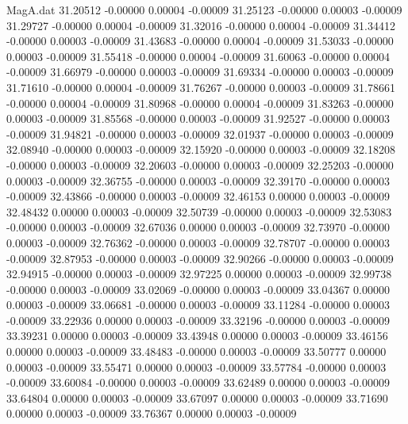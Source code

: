 \begin{filecontents}{MagA.dat}
  31.20512   -0.00000    0.00004   -0.00009
  31.25123   -0.00000    0.00003   -0.00009
  31.29727   -0.00000    0.00004   -0.00009
  31.32016   -0.00000    0.00004   -0.00009
  31.34412   -0.00000    0.00003   -0.00009
  31.43683   -0.00000    0.00004   -0.00009
  31.53033   -0.00000    0.00003   -0.00009
  31.55418   -0.00000    0.00004   -0.00009
  31.60063   -0.00000    0.00004   -0.00009
  31.66979   -0.00000    0.00003   -0.00009
  31.69334   -0.00000    0.00003   -0.00009
  31.71610   -0.00000    0.00004   -0.00009
  31.76267   -0.00000    0.00003   -0.00009
  31.78661   -0.00000    0.00004   -0.00009
  31.80968   -0.00000    0.00004   -0.00009
  31.83263   -0.00000    0.00003   -0.00009
  31.85568   -0.00000    0.00003   -0.00009
  31.92527   -0.00000    0.00003   -0.00009
  31.94821   -0.00000    0.00003   -0.00009
  32.01937   -0.00000    0.00003   -0.00009
  32.08940   -0.00000    0.00003   -0.00009
  32.15920   -0.00000    0.00003   -0.00009
  32.18208   -0.00000    0.00003   -0.00009
  32.20603   -0.00000    0.00003   -0.00009
  32.25203   -0.00000    0.00003   -0.00009
  32.36755   -0.00000    0.00003   -0.00009
  32.39170   -0.00000    0.00003   -0.00009
  32.43866   -0.00000    0.00003   -0.00009
  32.46153    0.00000    0.00003   -0.00009
  32.48432    0.00000    0.00003   -0.00009
  32.50739   -0.00000    0.00003   -0.00009
  32.53083   -0.00000    0.00003   -0.00009
  32.67036    0.00000    0.00003   -0.00009
  32.73970   -0.00000    0.00003   -0.00009
  32.76362   -0.00000    0.00003   -0.00009
  32.78707   -0.00000    0.00003   -0.00009
  32.87953   -0.00000    0.00003   -0.00009
  32.90266   -0.00000    0.00003   -0.00009
  32.94915   -0.00000    0.00003   -0.00009
  32.97225    0.00000    0.00003   -0.00009
  32.99738   -0.00000    0.00003   -0.00009
  33.02069   -0.00000    0.00003   -0.00009
  33.04367    0.00000    0.00003   -0.00009
  33.06681   -0.00000    0.00003   -0.00009
  33.11284   -0.00000    0.00003   -0.00009
  33.22936    0.00000    0.00003   -0.00009
  33.32196   -0.00000    0.00003   -0.00009
  33.39231    0.00000    0.00003   -0.00009
  33.43948    0.00000    0.00003   -0.00009
  33.46156    0.00000    0.00003   -0.00009
  33.48483   -0.00000    0.00003   -0.00009
  33.50777    0.00000    0.00003   -0.00009
  33.55471    0.00000    0.00003   -0.00009
  33.57784   -0.00000    0.00003   -0.00009
  33.60084   -0.00000    0.00003   -0.00009
  33.62489    0.00000    0.00003   -0.00009
  33.64804    0.00000    0.00003   -0.00009
  33.67097    0.00000    0.00003   -0.00009
  33.71690    0.00000    0.00003   -0.00009
  33.76367    0.00000    0.00003   -0.00009

\end{filecontents}
